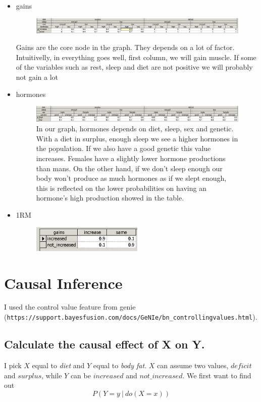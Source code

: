\documentclass[11pt]{article}
\newcommand\given[1][]{\:#1\vert\:}
\begin{document}
\begin{itemize}
\item gains
\begin{figure}[H]
\includegraphics[width=\textwidth]{./images/nodes/definitions/9.png}
\end{figure}
Gains are the core node in the graph. They depends on a lot of factor. Intuitivelly, in everything goes well, first column, we will gain muscle. If some of the variables such as rest, sleep and diet are not positive we will probably not gain a lot

\item hormones
\begin{figure}[H]
\includegraphics[width=\textwidth]{./images/nodes/definitions/10.png}
In our graph, hormones depends on diet, sleep, sex and genetic. With a diet in surplus, enough sleep we see a higher hormones in the population. If we also have a good genetic this value increases. Females have a slightly lower hormone productions than mans. On the other hand, if we don't sleep enough our body won't produce as much hormones as if we slept enough, this is reflected on the lower probabilities on having an hormone's high production showed in the table.
\end{figure}
\item 1RM 
\begin{figure}[H]
\includegraphics[width=0.5\textwidth]{./images/nodes/definitions/11.png}
\end{figure}
\end{itemize}

\section{Causal Inference}
I used the control value feature from genie (\texttt{https://support.bayesfusion.com/docs/GeNIe/bn\_controllingvalues.html}).
\subsection{Calculate the causal effect of X on Y.}
	I pick $X$ equal to \emph{diet} and $Y$ equal to \emph{body fat}. $X$ can assume two values, $deficit$ and $surplus$, while $Y$ can be $increased$ and $not\_increased$. We first want to find out
	\begin{equation}
		P(Y=y \given do(X=x))
	\label{eq:1}
	\end{equation}
	
\end{document}
